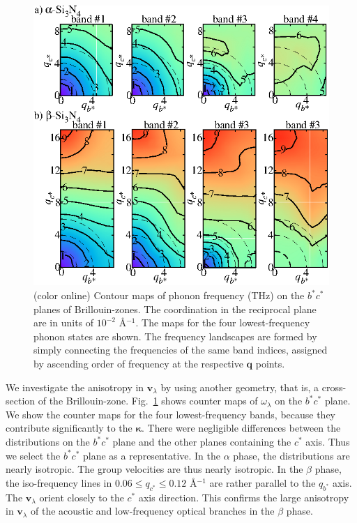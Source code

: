 \documentclass[twocolumn,amsmath,amssymb,a4paper,prb,superscriptaddress,floatfix]{revtex4-1}
\begin{document}
\begin{figure}[ht]
 \centerins
  \includegraphics[width=\linewidth]{Fig2_small.eps} \caption{(color
  online) Contour maps of phonon frequency (THz) on the $b^*c^*$
  planes of Brillouin-zones. The coordination in the reciprocal plane 
   are in units of $10^{-2}$ \AA$^{-1}$. The maps for the four lowest-frequency
  phonon states are shown. The frequency landscapes are formed by simply
  connecting the frequencies of the same band indices, assigned by
  ascending order of frequency at the respective $\mathbf {q}$
  points. \label{fig:Fig3_338} }
 \centering
\end{figure}

We investigate the anisotropy in $\mathbf{v}_{\lambda}$ by using another
geometry, that is, a cross-section of the Brillouin-zone.
Fig.~\ref{fig:Fig3_338} shows counter maps of $\omega_{\lambda}$  on the
$b^*c^*$ plane.  We show the counter maps for the four lowest-frequency bands,
because they contribute significantly to the $\boldsymbol{\kappa}$.  There were
negligible differences between the distributions on the $b^*c^*$ plane and the
other planes containing the $c^*$ axis.  Thus we select the $b^*c^*$ plane as a
representative.  In the $\alpha$ phase, the distributions are nearly isotropic.
The group velocities are thus nearly isotropic. In the $\beta$ phase, the
iso-frequency lines in $0.06 \le q_{c^*} \le 0.12$ \AA$^{-1}$ are rather
parallel to the $q_{b^*}$ axis.  The $\mathbf{v}_{\lambda}$ orient closely to
the $c^*$ axis direction. This confirms the large anisotropy in
$\mathbf{v}_{\lambda}$ of the acoustic and low-frequency optical branches in the
$\beta$ phase.
\end{document}
